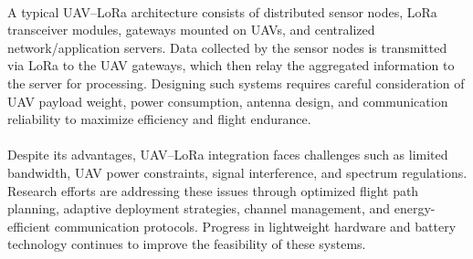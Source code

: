 \paragraph{}
A typical UAV–LoRa architecture consists of distributed sensor nodes, LoRa transceiver modules, gateways mounted on UAVs, and centralized network/application servers. Data collected by the sensor nodes is transmitted via LoRa to the UAV gateways, which then relay the aggregated information to the server for processing. Designing such systems requires careful consideration of UAV payload weight, power consumption, antenna design, and communication reliability to maximize efficiency and flight endurance.

\paragraph{}
Despite its advantages, UAV–LoRa integration faces challenges such as limited bandwidth, UAV power constraints, signal interference, and spectrum regulations. Research efforts are addressing these issues through optimized flight path planning, adaptive deployment strategies, channel management, and energy-efficient communication protocols. Progress in lightweight hardware and battery technology continues to improve the feasibility of these systems.\cite{davoli2021hybrid}
